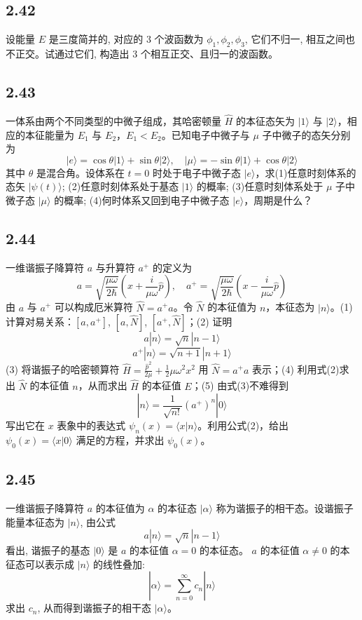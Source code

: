 \subsection{2.42}
设能量 $E$ 是三度简并的, 对应的 3 个波函数为 $\phi_1, \phi_2, \phi_3$, 它们不归一, 相互之间也不正交。试通过它们, 构造出 3 个相互正交、且归一的波函数。

\subsection{2.43}
一体系由两个不同类型的中微子组成，其哈密顿量 $\hat{H}$ 的本征态矢为 $|1\rangle$ 与 $|2\rangle$，相应的本征能量为 $E_1$ 与 $E_2$，$E_1 < E_2$。已知电子中微子与 $\mu$ 子中微子的态矢分别为
$$|e\rangle = \cos \theta |1\rangle + \sin \theta |2\rangle, \quad |\mu\rangle = -\sin \theta |1\rangle + \cos \theta |2\rangle$$
其中 $\theta$ 是混合角。设体系在 $t=0$ 时处于电子中微子态 $|e\rangle$，求(1)任意时刻体系的态矢 $|\psi(t)\rangle$; (2)任意时刻体系处于基态 $|1\rangle$ 的概率; (3)任意时刻体系处于 $\mu$ 子中微子态 $|\mu\rangle$ 的概率; (4)何时体系又回到电子中微子态 $|e\rangle$，周期是什么？

\subsection{2.44}
一维谐振子降算符 $a$ 与升算符 $a^+$ 的定义为
$$a = \sqrt{\frac{\mu\omega}{2\hbar}} \left( x + \frac{i}{\mu\omega} \hat{p} \right), \quad a^+ = \sqrt{\frac{\mu\omega}{2\hbar}} \left( x - \frac{i}{\mu\omega} \hat{p} \right)$$
由 $a$ 与 $a^+$ 可以构成厄米算符 $\hat{N} = a^+ a$。令 $\hat{N}$ 的本征值为 $n$，本征态为 $|n\rangle$。(1) 计算对易关系：$[a,a^+]$, $[a,\hat{N}]$, $[a^+,\hat{N}]$；(2) 证明
$$a|n\rangle = \sqrt{n}|n-1\rangle$$
$$a^+|n\rangle = \sqrt{n+1}|n+1\rangle$$
(3) 将谐振子的哈密顿算符 $\hat{H} = \frac{\hat{p}^2}{2\mu} + \frac{1}{2}\mu\omega^2 x^2$ 用 $\hat{N} = a^+ a$ 表示；(4) 利用式(2)求出 $\hat{N}$ 的本征值 $n$，从而求出 $\hat{H}$ 的本征值 $E$；(5) 由式(3)不难得到
$$|n\rangle = \frac{1}{\sqrt{n!}}(a^+)^n |0\rangle$$
写出它在 $x$ 表象中的表达式 $\psi_n(x) = \langle x|n\rangle$。利用公式(2)，给出 $\psi_0(x) = \langle x|0\rangle$ 满足的方程，并求出 $\psi_0(x)$。

\subsection{2.45}
一维谐振子降算符 $a$ 的本征值为 $\alpha$ 的本征态 $|\alpha\rangle$ 称为谐振子的相干态。设谐振子能量本征态为 $|n\rangle$, 由公式
$$a|n\rangle = \sqrt{n}|n-1\rangle$$
看出, 谐振子的基态 $|0\rangle$ 是 $a$ 的本征值 $\alpha=0$ 的本征态。 $a$ 的本征值 $\alpha \neq 0$ 的本征态可以表示成 $|n\rangle$ 的线性叠加:
$$|\alpha\rangle = \sum_{n=0}^{\infty}c_n|n\rangle$$
求出 $c_n$, 从而得到谐振子的相干态 $|\alpha\rangle$。

